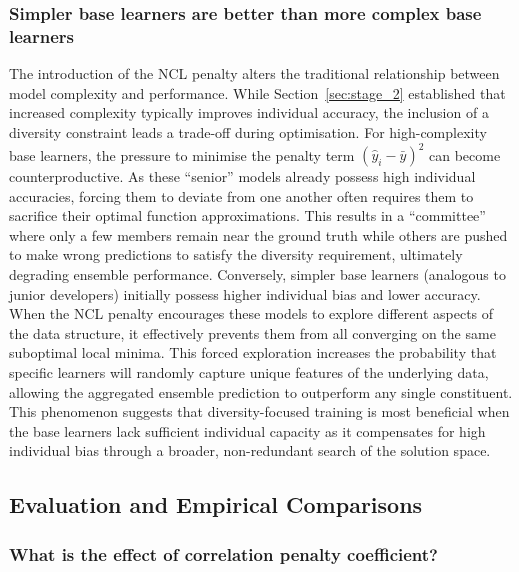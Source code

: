 \documentclass{article}
\begin{document}
\subsubsection{Simpler base learners are better than more complex base learners}
The introduction of the NCL penalty alters the traditional relationship between model complexity and performance. While Section~\ref{sec:stage_2} established that increased complexity typically improves individual accuracy, the inclusion of a diversity constraint leads a trade-off during optimisation. For high-complexity base learners, the pressure to minimise the penalty term $(\hat{y}_i - \bar{y})^2$ can become counterproductive. As these ``senior'' models already possess high individual accuracies, forcing them to deviate from one another often requires them to sacrifice their optimal function approximations. This results in a ``committee'' where only a few members remain near the ground truth while others are pushed to make wrong predictions to satisfy the diversity requirement, ultimately degrading ensemble performance. 
Conversely, simpler base learners (analogous to junior developers) initially possess higher individual bias and lower accuracy. When the NCL penalty encourages these models to explore different aspects of the data structure, it effectively prevents them from all converging on the same suboptimal local minima. This forced exploration increases the probability that specific learners will randomly capture unique features of the underlying data, allowing the aggregated ensemble prediction to outperform any single constituent. This phenomenon suggests that diversity-focused training is most beneficial when the base learners lack sufficient individual capacity as it compensates for high individual bias through a broader, non-redundant search of the solution space. 


\subsection{Evaluation and Empirical Comparisons}


\subsubsection{What is the effect of correlation penalty coefficient?}
\end{document}

